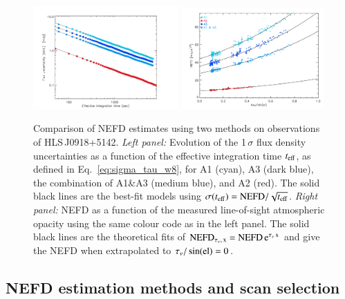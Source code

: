 \documentclass[traditionalabstract]{aa}
\newcommand{\hls}{HLS\,J0918+5142}
\newcommand{\elev}{\rm{el}}
\newcommand{\taunu}{\tau_{\nu}}
\begin{document}
{\begin{figure}[!thbp]
  \begin{center}
    \includegraphics[trim={0.5cm, 0, 0, 0.5cm}, clip, angle=0, width=0.495\textwidth]{Figures/hls_nefd_vst-eps-converted-to.pdf}
    \includegraphics[trim={0.5cm, 0, 0.2cm, 0.5cm}, clip, angle=0, width=0.485\textwidth]{Figures/hls_NEFD_vs_TauElev_all-eps-converted-to.pdf}
    \caption{Comparison of NEFD estimates using two methods on observations of
      \hls. \emph{Left panel:} Evolution of the 1\,$\sigma$ flux density
      uncertainties as a function of the effective integration time
      $t_{\rm{eff}}$, as defined in Eq.~\ref{eq:sigma_tau_w8}, for A1
    (cyan), A3 (dark blue), the combination of A1\&A3 (medium blue),
    and A2 (red). The solid black lines are the best-fit models using
    $\sigma(t_{\rm{eff}}) =  \rm{NEFD}/\sqrt{t_{\rm{eff}}}$. \emph{Right panel:} NEFD as a function of the
    measured line-of-sight atmospheric opacity using the same colour code as in the
    left panel. The solid black lines are the theoretical
    fits of $\rm{NEFD}_{\taunu,\, x } = \rm{NEFD}\, e^{\taunu\,x}$ and give the
    NEFD when extrapolated to $\taunu/\sin(\elev)= 0$. }
    \label{fig:nefd_twomethods}
  \end{center}
\end{figure}

\subsection{NEFD estimation methods and scan selection}
\label{se:nefd_method}

}
\end{document}
